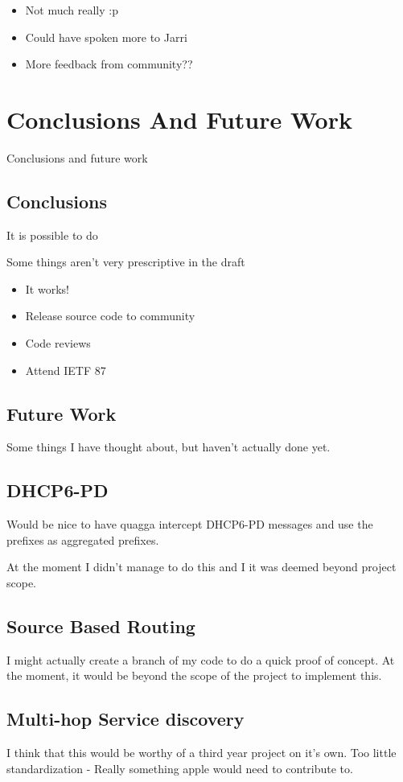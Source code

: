 \documentclass[12pt]{report}
\begin{document}
\begin{itemize}
\item Not much really :p
\item Could have spoken more to Jarri
\item More feedback from community??
\end{itemize}

\chapter{Conclusions And Future Work}
Conclusions and future work

\section{Conclusions}

It is possible to do

Some things aren't very prescriptive in the draft

\begin{itemize}
\item It works! 
\item Release source code to community
\item Code reviews
\item Attend IETF 87
\end{itemize}

\section{Future Work}
Some things I have thought about, but haven't actually done yet.

\section{DHCP6-PD}
Would be nice to have quagga intercept DHCP6-PD messages and use the prefixes as aggregated prefixes. 

At the moment I didn't manage to do this and I it was deemed beyond project scope.

\section{Source Based Routing}
I might actually create a branch of my code to do a quick proof of concept. At the moment, 
it would be beyond the scope of the project to implement this. 

\section{Multi-hop Service discovery}
I think that this would be worthy of a third year project on it's own. 
Too little standardization - Really something apple would need to contribute to. 
\end{document}
